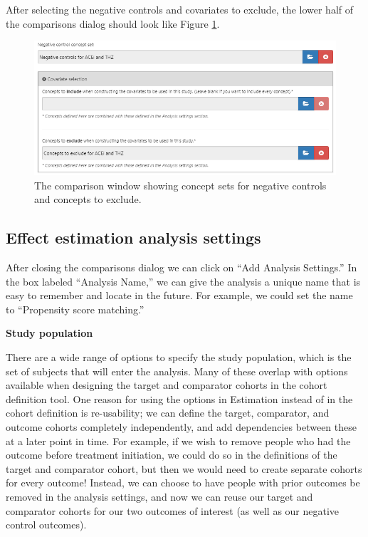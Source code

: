 \documentclass[11pt]{book}
\theoremstyle{definition}
\theoremstyle{definition}
\theoremstyle{definition}
\theoremstyle{remark}
\begin{document}
After selecting the negative controls and covariates to exclude, the lower half of the comparisons dialog should look like Figure \ref{fig:comparisons2}.

\begin{figure}

{\centering \includegraphics[width=1\linewidth]{images/PopulationLevelEstimation/comparisons2} 

}

\caption{The comparison window showing concept sets for negative controls and concepts to exclude.}\label{fig:comparisons2}
\end{figure}

\hypertarget{effect-estimation-analysis-settings}{%
\subsection{Effect estimation analysis settings}\label{effect-estimation-analysis-settings}}

After closing the comparisons dialog we can click on ``Add Analysis Settings.'' In the box labeled ``Analysis Name,'' we can give the analysis a unique name that is easy to remember and locate in the future. For example, we could set the name to ``Propensity score matching.''

\textbf{Study population}

There are a wide range of options to specify the study population, which is the set of subjects that will enter the analysis. Many of these overlap with options available when designing the target and comparator cohorts in the cohort definition tool. One reason for using the options in Estimation instead of in the cohort definition is re-usability; we can define the target, comparator, and outcome cohorts completely independently, and add dependencies between these at a later point in time. For example, if we wish to remove people who had the outcome before treatment initiation, we could do so in the definitions of the target and comparator cohort, but then we would need to create separate cohorts for every outcome! Instead, we can choose to have people with prior outcomes be removed in the analysis settings, and now we can reuse our target and comparator cohorts for our two outcomes of interest (as well as our negative control outcomes).
\end{document}
